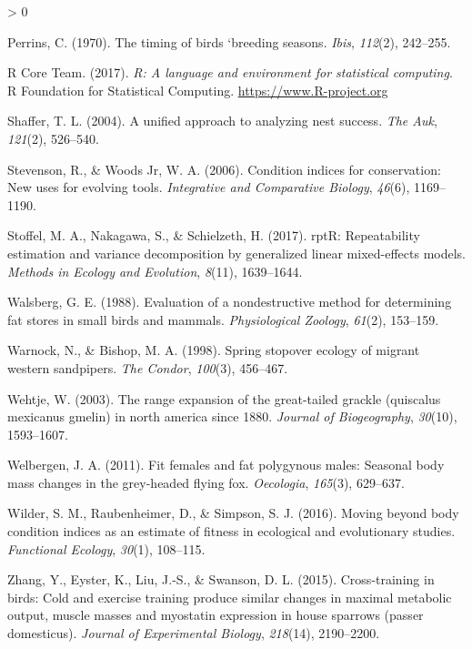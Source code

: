 \documentclass[
]{article}
\newlength{\cslhangindent}
\newenvironment{CSLReferences}[2] %
 {%
  \setlength{\parindent}{0pt}
  \ifodd #1 \everypar{\setlength{\hangindent}{\cslhangindent}}\ignorespaces\fi
  \ifnum #2 > 0
  \setlength{\parskip}{#2\baselineskip}
  \fi
 }%
 {}
\begin{document}
\begin{CSLReferences}{1}{0}
\leavevmode\hypertarget{ref-perrins1970timing}{}%
Perrins, C. (1970). The timing of birds `breeding seasons. \emph{Ibis},
\emph{112}(2), 242--255.

\leavevmode\hypertarget{ref-rcoreteam}{}%
R Core Team. (2017). \emph{R: A language and environment for statistical
computing}. R Foundation for Statistical Computing.
\url{https://www.R-project.org}

\leavevmode\hypertarget{ref-shaffer2004unified}{}%
Shaffer, T. L. (2004). A unified approach to analyzing nest success.
\emph{The Auk}, \emph{121}(2), 526--540.

\leavevmode\hypertarget{ref-stevenson2006condition}{}%
Stevenson, R., \& Woods Jr, W. A. (2006). Condition indices for
conservation: New uses for evolving tools. \emph{Integrative and
Comparative Biology}, \emph{46}(6), 1169--1190.

\leavevmode\hypertarget{ref-stoffel2017rptr}{}%
Stoffel, M. A., Nakagawa, S., \& Schielzeth, H. (2017). rptR:
Repeatability estimation and variance decomposition by generalized
linear mixed-effects models. \emph{Methods in Ecology and Evolution},
\emph{8}(11), 1639--1644.

\leavevmode\hypertarget{ref-walsberg1988evaluation}{}%
Walsberg, G. E. (1988). Evaluation of a nondestructive method for
determining fat stores in small birds and mammals. \emph{Physiological
Zoology}, \emph{61}(2), 153--159.

\leavevmode\hypertarget{ref-warnock1998spring}{}%
Warnock, N., \& Bishop, M. A. (1998). Spring stopover ecology of migrant
western sandpipers. \emph{The Condor}, \emph{100}(3), 456--467.

\leavevmode\hypertarget{ref-wehtje2003range}{}%
Wehtje, W. (2003). The range expansion of the great-tailed grackle
(quiscalus mexicanus gmelin) in north america since 1880. \emph{Journal
of Biogeography}, \emph{30}(10), 1593--1607.

\leavevmode\hypertarget{ref-welbergen2011fit}{}%
Welbergen, J. A. (2011). Fit females and fat polygynous males: Seasonal
body mass changes in the grey-headed flying fox. \emph{Oecologia},
\emph{165}(3), 629--637.

\leavevmode\hypertarget{ref-wilder2016moving}{}%
Wilder, S. M., Raubenheimer, D., \& Simpson, S. J. (2016). Moving beyond
body condition indices as an estimate of fitness in ecological and
evolutionary studies. \emph{Functional Ecology}, \emph{30}(1), 108--115.

\leavevmode\hypertarget{ref-zhang2015cross}{}%
Zhang, Y., Eyster, K., Liu, J.-S., \& Swanson, D. L. (2015).
Cross-training in birds: Cold and exercise training produce similar
changes in maximal metabolic output, muscle masses and myostatin
expression in house sparrows (passer domesticus). \emph{Journal of
Experimental Biology}, \emph{218}(14), 2190--2200.

\end{CSLReferences}
\end{document}
